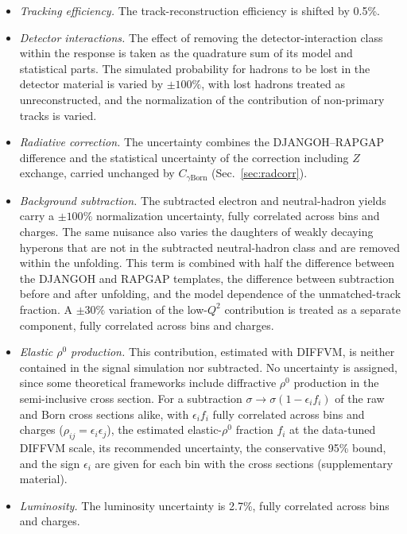 \documentclass[11pt,a4paper]{article}
\newcommand{\Qsq}{Q^{2}}
\newcommand{\Cgam}{C_{\gamma\mathrm{Born}}}
\begin{document}
\begin{itemize}
  \item \textit{Tracking efficiency.} The track-reconstruction efficiency is shifted by 0.5\%.
  \item \textit{Detector interactions.} The effect of removing the detector-interaction class within the response is taken as the quadrature sum of its model and statistical parts. The simulated probability for hadrons to be lost in the detector material is varied by $\pm100\%$, with lost hadrons treated as unreconstructed, and the normalization of the contribution of non-primary tracks is varied.
  \item \textit{Radiative correction.} The uncertainty combines the DJANGOH--RAPGAP difference and the statistical uncertainty of the correction including $Z$ exchange, carried unchanged by $\Cgam$ (Sec.~\ref{sec:radcorr}).
  \item \textit{Background subtraction.} The subtracted electron and neutral-hadron yields carry a $\pm100\%$ normalization uncertainty, fully correlated across bins and charges. The same nuisance also varies the daughters of weakly decaying hyperons that are not in the subtracted neutral-hadron class and are removed within the unfolding. This term is combined with half the difference between the DJANGOH and RAPGAP templates, the difference between subtraction before and after unfolding, and the model dependence of the unmatched-track fraction. A $\pm30\%$ variation of the low-$\Qsq$ contribution is treated as a separate component, fully correlated across bins and charges.
  \item \textit{Elastic $\rho^{0}$ production.} This contribution, estimated with DIFFVM, is neither contained in the signal simulation nor subtracted. No uncertainty is assigned, since some theoretical frameworks include diffractive $\rho^{0}$ production in the semi-inclusive cross section. For a subtraction $\sigma\to\sigma(1-\epsilon_{i}f_{i})$ of the raw and Born cross sections alike, with $\epsilon_{i}f_{i}$ fully correlated across bins and charges ($\rho_{ij}=\epsilon_{i}\epsilon_{j}$), the estimated elastic-$\rho^{0}$ fraction $f_{i}$ at the data-tuned DIFFVM scale, its recommended uncertainty, the conservative 95\% bound, and the sign $\epsilon_{i}$ are given for each bin with the cross sections (supplementary material).
  \item \textit{Luminosity.} The luminosity uncertainty is 2.7\%, fully correlated across bins and charges.
\end{itemize}
\end{document}
